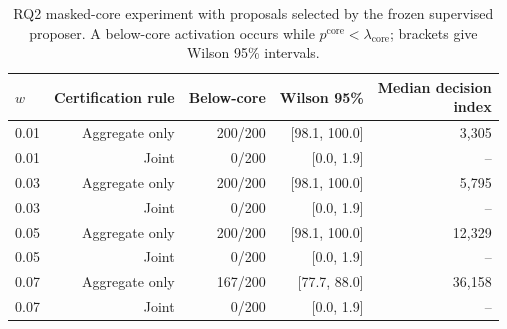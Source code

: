 \begin{table}[t]
\centering
\small
\caption{RQ2 masked-core experiment with proposals selected by the frozen supervised proposer. A below-core activation occurs while $p^{\mathrm{core}}<\lambda_{\mathrm{core}}$; brackets give Wilson 95\% intervals.}
\label{tab:rq2-masked-core}
\begin{tabular}{@{}lrrrr@{}}
\toprule
$w$ & Certification rule & Below-core & Wilson 95\% & \shortstack{Median decision\\index} \\
\midrule
0.01 & Aggregate only & 200/200 & [98.1, 100.0] & 3,305 \\
0.01 & Joint & 0/200 & [0.0, 1.9] & -- \\
0.03 & Aggregate only & 200/200 & [98.1, 100.0] & 5,795 \\
0.03 & Joint & 0/200 & [0.0, 1.9] & -- \\
0.05 & Aggregate only & 200/200 & [98.1, 100.0] & 12,329 \\
0.05 & Joint & 0/200 & [0.0, 1.9] & -- \\
0.07 & Aggregate only & 167/200 & [77.7, 88.0] & 36,158 \\
0.07 & Joint & 0/200 & [0.0, 1.9] & -- \\
\bottomrule
\end{tabular}
\end{table}
